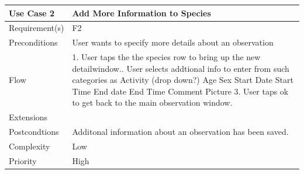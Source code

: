 \hspace{2em}

\begin{tabular}[t]{|l|p{}|}\hline
	Use Case 2&Add More Information to Species\\\hline
	Requirement(s)&F2\\\hline
	Preconditions&User wants to specify more details about an observation\\\hline
	Flow& 1. User taps the the species row to bring up the new detailwindow.\newline
	2. User selects addtional info to enter from such categories as \newline
	Activity (drop down?) \newline
	Age\newline
	Sex\newline
	Start Date\newline
	Start Time\newline
	End date \newline
	End Time \newline
	Comment \newline
	Picture \newline
	3. User taps ok to get back to the main observation window.\\\hline
	Extensions& \\\hline
	Postcondtions&Additonal information about an observation has been saved.\\\hline
	Complexity&Low\\\hline
	Priority&High\\\hline
\end{tabular}

\hspace{2em}

